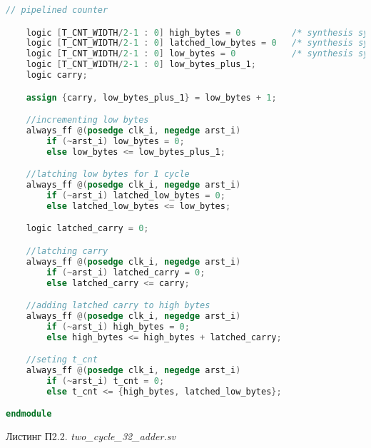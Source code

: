\begin{lstlisting}[language=Verilog]
	// pipelined counter

	logic [T_CNT_WIDTH/2-1 : 0] high_bytes = 0 			/* synthesis syn_keep=1 syn_preserve=1 syn_ramstyle="registers" */;
	logic [T_CNT_WIDTH/2-1 : 0] latched_low_bytes = 0 	/* synthesis syn_keep=1 syn_preserve=1 syn_ramstyle="registers" */;
	logic [T_CNT_WIDTH/2-1 : 0] low_bytes = 0 			/* synthesis syn_keep=1 syn_preserve=1 syn_ramstyle="registers" */;
	logic [T_CNT_WIDTH/2-1 : 0] low_bytes_plus_1;
	logic carry;

	assign {carry, low_bytes_plus_1} = low_bytes + 1;

	//incrementing low bytes
	always_ff @(posedge clk_i, negedge arst_i) 
		if (~arst_i) low_bytes = 0;
		else low_bytes <= low_bytes_plus_1;

	//latching low bytes for 1 cycle
	always_ff @(posedge clk_i, negedge arst_i) 
		if (~arst_i) latched_low_bytes = 0;
		else latched_low_bytes <= low_bytes;

	logic latched_carry = 0;

	//latching carry
	always_ff @(posedge clk_i, negedge arst_i) 
		if (~arst_i) latched_carry = 0;
		else latched_carry <= carry;

	//adding latched carry to high bytes
	always_ff @(posedge clk_i, negedge arst_i)
		if (~arst_i) high_bytes = 0;
		else high_bytes <= high_bytes + latched_carry;

	//seting t_cnt
	always_ff @(posedge clk_i, negedge arst_i) 
		if (~arst_i) t_cnt = 0;
		else t_cnt <= {high_bytes, latched_low_bytes};

endmodule
\end{lstlisting}

\begin{flushright}
Листинг П2.2. \emph{two\_cycle\_32\_adder.sv}
\end{flushright}

